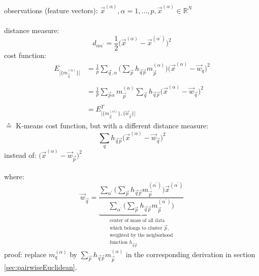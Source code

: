 observations (feature vectors): $\vec{x}^{(\alpha)}, \alpha = 1, \ldots, p, \vec{x}^{(\alpha)} \in \mathbb{R}^N$
\\\\
distance measure:
\begin{equation}
	d_{\alpha \alpha^{'}}
	= \frac{1}{2} \big( \vec{x}^{(\alpha)} - \vec{x}^{(\alpha^{'})}
		\big)^2
\end{equation}
cost function:
\begin{equation}
	\begin{array}{ll}
	E_{ \big[ \big\{ m_{\vec{q}}^{(\alpha)} \big\} \big] }
	& = \frac{1}{p} \sum\limits_{\vec{q}, \alpha} \Big( 
		\sum\limits_{\vec{p}} h_{\vec{q} \vec{p}} m_{\vec{p}}^{(\alpha)}
		\Big) \big( \vec{x}^{(\alpha)} - \vec{w}_q \big)^2 \\\\
	& = \frac{1}{p} \sum\limits_{\vec{p} \alpha} m_{\vec{p}}^{(\alpha)}
		\sum\limits_{\vec{q}} h_{\vec{q} \vec{p}} \big( 
		\vec{x}^{(\alpha)} - \vec{w}_{\vec{q}} \big)^2 \\\\
	& = E_{ \big[ \big\{ m_{\vec{q}}^{(\alpha)} \big\}, \big\{ 
		\vec{w}_{\vec{q}} \big\} \big] }^T
	\end{array}
\end{equation}
$\corresponds$ K-means cost function, but with a different distance measure:
\begin{equation}
	\sum\limits_q h_{\vec{q} \vec{p}} \big( \vec{x}^{(\alpha)} -
		\vec{w}_{\vec{q}} \big)^2
\end{equation}
instead of: $\big( \vec{x}^{(\alpha)} - \vec{w}_{\vec{p}} \big)^2$
\\\\
where:
\begin{equation}
	\vec{w}_{\vec{q}} 
	= \underbrace{
		\frac{ \sum\limits_{\alpha^{'}} \Big( \sum\limits_{\vec{p}}
		h_{\vec{q} \vec{p}} m_{\vec{p}}^{(\alpha^{'})} \Big) 
		\vec{x}^{(\alpha^{'})} }{ 
			\sum\limits_{\alpha^{'}} \Big(
			\sum\limits_{\vec{p}} h_{\vec{q} \vec{p}}
			m_{\vec{p}}^{(\alpha^{'})} \Big) } }_{
	\substack{	\text{center of mass of all data} \\
			\text{which belongs to cluster } \vec{p}, \\
			\text{weighted by the neigborhood} \\
			\text{function } h_{\vec{q} \vec{p}}}}
\end{equation}
proof: replace $m_q^{(\alpha)}$ by $\sum\limits_{\vec{p}} h_{\vec{q} \vec{p}} m_{\vec{p}}^{(\alpha)}$ in the corresponding derivation in section \ref{sec:pairwiseEuclidean}.
\\\\
